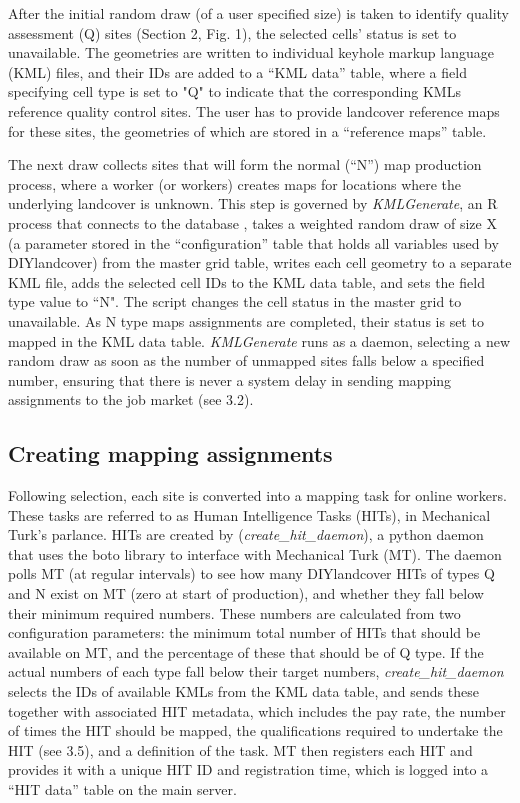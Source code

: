 \documentclass[preprint,12pt,authoryear]{elsarticle}
\begin{document}
After the initial random draw (of a user specified size) is taken to identify quality assessment (Q) sites (Section 2, Fig. 1), the selected cells' status is set to unavailable. The geometries are written to individual keyhole markup language (KML) files, and their IDs are added to a ``KML data'' table, where a field specifying cell type is set to "Q" to indicate that the corresponding KMLs reference quality control sites. The user has to provide landcover reference maps for these sites, the geometries of which are stored in a ``reference maps'' table.  

The next draw collects sites that will form the normal (``N'') map production process, where a worker (or workers) creates maps for locations where the underlying landcover is unknown.  This step is governed by \emph{KMLGenerate}, an R process that connects to the database \citep[via the RPostgreSQL package; ][]{conway_rpostgresql:_2012}, takes a weighted random draw of size X (a parameter stored in the ``configuration'' table that holds all variables used by DIYlandcover) from the master grid table, writes each cell geometry to a separate KML file, adds the selected cell IDs to the KML data table, and sets the field type value to ``N". The script changes the cell status in the master grid to unavailable. As N type maps assignments are completed, their status is set to mapped in the KML data table. \emph{KMLGenerate} runs as a daemon, selecting a new random draw as soon as the number of unmapped sites falls below a specified number, ensuring that there is never a system delay in sending mapping assignments to the job market (see 3.2).  

\subsection{Creating mapping assignments}
Following selection, each site is converted into a mapping task for online workers. These tasks are referred to as Human Intelligence Tasks (HITs), in Mechanical Turk's parlance. HITs are created by (\emph{create\_hit\_daemon}), a python daemon that uses the boto library to interface with Mechanical Turk (MT). The daemon polls MT (at regular intervals) to see how many DIYlandcover HITs of types Q and N exist on MT (zero at start of production), and whether they fall below their minimum required numbers. These numbers are calculated from two configuration parameters: the minimum total number of HITs that should be available on MT, and the percentage of these that should be of Q type. If the actual numbers of each type fall below their target numbers, \emph{create\_hit\_daemon} selects the IDs of available KMLs from the KML data table, and sends these together with associated HIT metadata, which includes the pay rate, the number of times the HIT should be mapped, the qualifications required to undertake the HIT (see 3.5), and a definition of the task. MT then registers each HIT and provides it with a unique HIT ID and registration time, which is logged into a ``HIT data'' table on the main server. 
\end{document}
